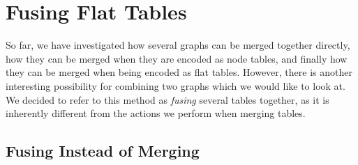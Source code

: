 \documentclass[a4paper,12pt,twoside,BCOR=10mm]{scrbook}
\begin{document}

\section{Fusing Flat Tables}
\label{sec:fusing_flat_tables}
%

So far, we have investigated how several graphs can be merged together directly,
how they can be merged when they are encoded as node tables,
and finally how they can be merged when being encoded as flat tables.
However, there is another interesting possibility for
combining two graphs which we would like to look at.
We decided to refer to this method as \textit{fusing} several tables together,
as it is inherently different from the actions we perform when merging tables.

\subsection{Fusing Instead of Merging}
\end{document}
